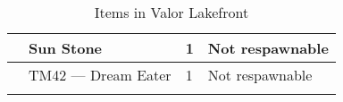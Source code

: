 \begin{longtable}{|| l l l l ||}%
\hline%
&Sun Stone&1&Not respawnable\\%
\hline%
&TM42 — Dream Eater&1&Not respawnable\\%
\hline%
\endhead%
\hline%
\caption{Items in Valor Lakefront}%
\label{tab:ValorLakefrontItems}%
\end{longtable}